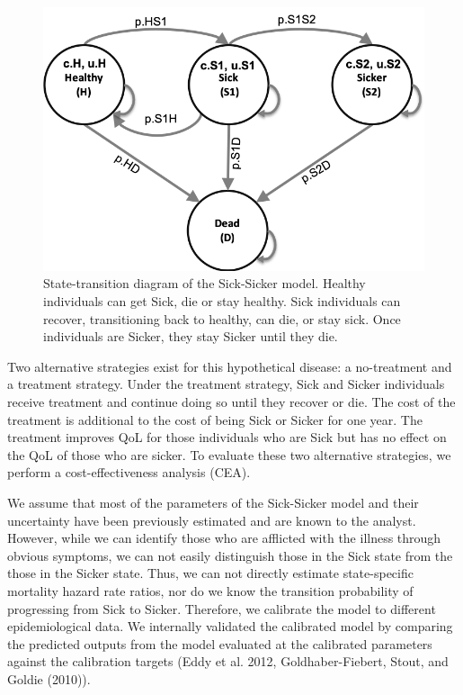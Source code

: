 \documentclass[]{article}
\begin{document}
\begin{figure}
\centering
\includegraphics{../figs/Sick-Sicker figure.png}
\caption{State-transition diagram of the Sick-Sicker model. Healthy
individuals can get Sick, die or stay healthy. Sick individuals can
recover, transitioning back to healthy, can die, or stay sick. Once
individuals are Sicker, they stay Sicker until they die.
\label{fig:STM Sick-Sicker}}
\end{figure}

Two alternative strategies exist for this hypothetical disease: a
no-treatment and a treatment strategy. Under the treatment strategy,
Sick and Sicker individuals receive treatment and continue doing so
until they recover or die. The cost of the treatment is additional to
the cost of being Sick or Sicker for one year. The treatment improves
QoL for those individuals who are Sick but has no effect on the QoL of
those who are sicker. To evaluate these two alternative strategies, we
perform a cost-effectiveness analysis (CEA).

We assume that most of the parameters of the Sick-Sicker model and their
uncertainty have been previously estimated and are known to the analyst.
However, while we can identify those who are afflicted with the illness
through obvious symptoms, we can not easily distinguish those in the
Sick state from the those in the Sicker state. Thus, we can not directly
estimate state-specific mortality hazard rate ratios, nor do we know the
transition probability of progressing from Sick to Sicker. Therefore, we
calibrate the model to different epidemiological data. We internally
validated the calibrated model by comparing the predicted outputs from
the model evaluated at the calibrated parameters against the calibration
targets (Eddy et al. 2012, Goldhaber-Fiebert, Stout, and Goldie (2010)).
\end{document}
